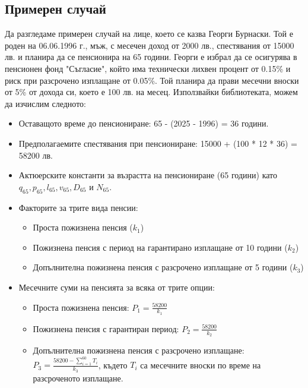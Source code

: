 \documentclass[a4paper,12pt]{article}
\begin{document}
\subsection{Примерен случай}
Да разгледаме примерен случай на лице, което се казва Георги Бурнаски. Той е роден на 06.06.1996 г., мъж, с месечен доход от 2000 лв., спестявания от 15000 лв. и планира да се пенсионира на 65 години.
\newline
Георги е избрал да се осигурява в пенсионен фонд "Съгласие", който има технически лихвен процент от 0.15\% и риск при разсрочено изплащане от 0.05\%. Той планира да прави месечни вноски от 5\% от дохода си, което е 100 лв. на месец.
\newline
\newline
Използвайки библиотеката, можем да изчислим следното:
\begin{itemize}
        \item Оставащото време до пенсиониране: 65 - (2025 - 1996) = 36 години.
        \item Предполагаемите спестявания при пенсиониране: 15000 + (100 * 12 * 36) = 58200 лв.
        \item Актюерските константи за възрастта на пенсиониране (65 години) като $q_{65}, p_{65}, l_{65}, v_{65}, D_{65}$ и $N_{65}$.
        \item Факторите за трите вида пенсии:
              \begin{itemize}
                      \item Проста пожизнена пенсия ($k_1$)
                      \item Пожизнена пенсия с период на гарантирано изплащане от 10 години ($k_2$)
                      \item Допълнителна пожизнена пенсия с разсрочено изплащане от 5 години ($k_3$)
              \end{itemize}
        \item Месечните суми на пенсията за всяка от трите опции:
              \begin{itemize}
                      \item Проста пожизнена пенсия: $P_1 = \frac{
                                            58200}{k_1}$
                      \item Пожизнена пенсия с гарантиран период: $P_2 = \frac{
                                            58200}{k_2}$
                      \item Допълнителна пожизнена пенсия с разсрочено изплащане: $P_3 = \frac{
                                            58200 - \sum_{i=1}^{60} T_i}{k_3}$, където $T_i$ са месечните вноски по време на разсроченото изплащане.
              \end{itemize}
\end{itemize}
\end{document}
